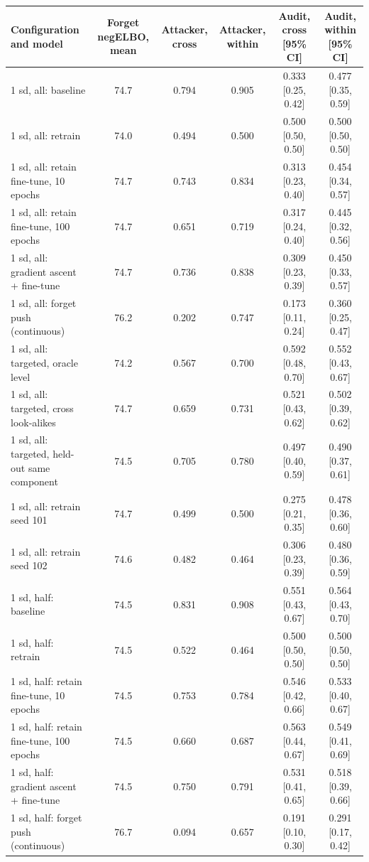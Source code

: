 \begin{tabular}{lccccc}
\toprule
Configuration and model & Forget negELBO, mean & Attacker, cross & Attacker, within & Audit, cross [95\% CI] & Audit, within [95\% CI] \\
\midrule
1 sd, all: baseline & 74.7 & 0.794 & 0.905 & 0.333 [0.25, 0.42] & 0.477 [0.35, 0.59] \\
1 sd, all: retrain & 74.0 & 0.494 & 0.500 & 0.500 [0.50, 0.50] & 0.500 [0.50, 0.50] \\
1 sd, all: retain fine-tune, 10 epochs & 74.7 & 0.743 & 0.834 & 0.313 [0.23, 0.40] & 0.454 [0.34, 0.57] \\
1 sd, all: retain fine-tune, 100 epochs & 74.7 & 0.651 & 0.719 & 0.317 [0.24, 0.40] & 0.445 [0.32, 0.56] \\
1 sd, all: gradient ascent + fine-tune & 74.7 & 0.736 & 0.838 & 0.309 [0.23, 0.39] & 0.450 [0.33, 0.57] \\
1 sd, all: forget push (continuous) & 76.2 & 0.202 & 0.747 & 0.173 [0.11, 0.24] & 0.360 [0.25, 0.47] \\
1 sd, all: targeted, oracle level & 74.2 & 0.567 & 0.700 & 0.592 [0.48, 0.70] & 0.552 [0.43, 0.67] \\
1 sd, all: targeted, cross look-alikes & 74.7 & 0.659 & 0.731 & 0.521 [0.43, 0.62] & 0.502 [0.39, 0.62] \\
1 sd, all: targeted, held-out same component & 74.5 & 0.705 & 0.780 & 0.497 [0.40, 0.59] & 0.490 [0.37, 0.61] \\
1 sd, all: retrain seed 101 & 74.7 & 0.499 & 0.500 & 0.275 [0.21, 0.35] & 0.478 [0.36, 0.60] \\
1 sd, all: retrain seed 102 & 74.6 & 0.482 & 0.464 & 0.306 [0.23, 0.39] & 0.480 [0.36, 0.59] \\
\midrule
1 sd, half: baseline & 74.5 & 0.831 & 0.908 & 0.551 [0.43, 0.67] & 0.564 [0.43, 0.70] \\
1 sd, half: retrain & 74.5 & 0.522 & 0.464 & 0.500 [0.50, 0.50] & 0.500 [0.50, 0.50] \\
1 sd, half: retain fine-tune, 10 epochs & 74.5 & 0.753 & 0.784 & 0.546 [0.42, 0.66] & 0.533 [0.40, 0.67] \\
1 sd, half: retain fine-tune, 100 epochs & 74.5 & 0.660 & 0.687 & 0.563 [0.44, 0.67] & 0.549 [0.41, 0.69] \\
1 sd, half: gradient ascent + fine-tune & 74.5 & 0.750 & 0.791 & 0.531 [0.41, 0.65] & 0.518 [0.39, 0.66] \\
1 sd, half: forget push (continuous) & 76.7 & 0.094 & 0.657 & 0.191 [0.10, 0.30] & 0.291 [0.17, 0.42] \\

\end{tabular}
